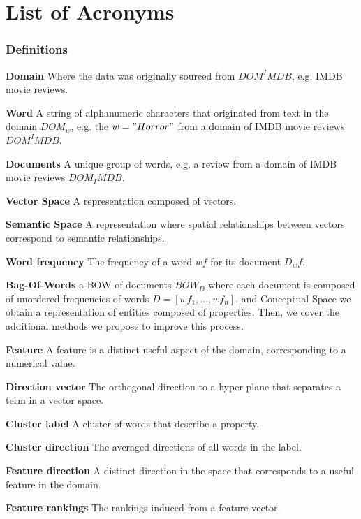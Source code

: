 \chapter*{List of Acronyms} 
\begin{acronym}

\end{acronym}


\subsection{Definitions}

\textbf{Domain} Where the data was originally sourced from $DOM^IMDB$, e.g. IMDB movie reviews.

\textbf{Word} A string of alphanumeric characters that originated from text in the domain $DOM_w$, e.g. the $w = "Horror"$ from a domain of IMDB movie reviews $DOM^IMDB$.

\textbf{Documents} A unique group of words, e.g. a review from a domain of IMDB movie reviews $DOM_IMDB$.

\textbf{Vector Space} A representation composed of vectors.

\textbf{Semantic Space} A representation where spatial relationships between vectors correspond to semantic relationships.


\textbf{Word frequency} The frequency of a word $wf$ for its document $D_wf$.


\textbf{Bag-Of-Words} a BOW of documents $BOW_D$ where each document is composed of unordered frequencies of words $D = [wf_1, ..., wf_n]$. and Conceptual Space we obtain a representation of entities composed of properties. Then, we cover the additional methods we propose to improve this process.


\textbf{Feature} A feature is a distinct useful aspect of the domain, corresponding to a numerical value. 

\textbf{Direction vector} The orthogonal direction to a hyper plane that separates a term in a vector space. 

\textbf{Cluster label} A cluster of words that describe a property.

\textbf{Cluster direction} The averaged directions of all words in the label.

\textbf{Feature direction} A distinct direction in the space that corresponds to a useful feature in the domain.

\textbf{Feature rankings} The rankings induced from a feature vector.

